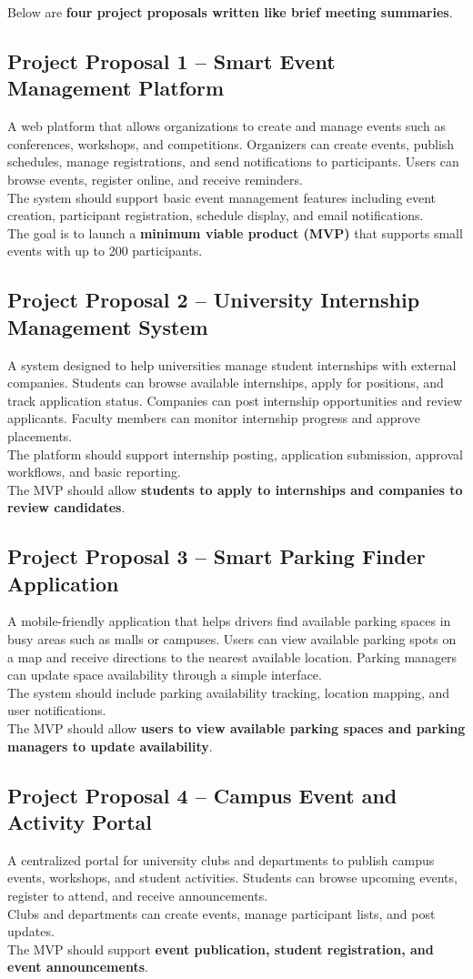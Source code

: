 \documentclass[11pt,a4paper]{article}
\newcommand{\labsub}[1]{\subsection*{#1}}
\begin{document}
Below are \textbf{four project proposals written like brief meeting summaries}.

\labsub{Project Proposal 1 -- Smart Event Management Platform}
A web platform that allows organizations to create and manage events such as conferences, workshops, and competitions. Organizers can create events, publish schedules, manage registrations, and send notifications to participants. Users can browse events, register online, and receive reminders.\\
The system should support basic event management features including event creation, participant registration, schedule display, and email notifications.\\
The goal is to launch a \textbf{minimum viable product (MVP)} that supports small events with up to 200 participants.

\labsub{Project Proposal 2 -- University Internship Management System}
A system designed to help universities manage student internships with external companies. Students can browse available internships, apply for positions, and track application status. Companies can post internship opportunities and review applicants. Faculty members can monitor internship progress and approve placements.\\
The platform should support internship posting, application submission, approval workflows, and basic reporting.\\
The MVP should allow \textbf{students to apply to internships and companies to review candidates}.

\labsub{Project Proposal 3 -- Smart Parking Finder Application}
A mobile-friendly application that helps drivers find available parking spaces in busy areas such as malls or campuses. Users can view available parking spots on a map and receive directions to the nearest available location. Parking managers can update space availability through a simple interface.\\
The system should include parking availability tracking, location mapping, and user notifications.\\
The MVP should allow \textbf{users to view available parking spaces and parking managers to update availability}.

\labsub{Project Proposal 4 -- Campus Event and Activity Portal}
A centralized portal for university clubs and departments to publish campus events, workshops, and student activities. Students can browse upcoming events, register to attend, and receive announcements.\\
Clubs and departments can create events, manage participant lists, and post updates.\\
The MVP should support \textbf{event publication, student registration, and event announcements}.
\end{document}
